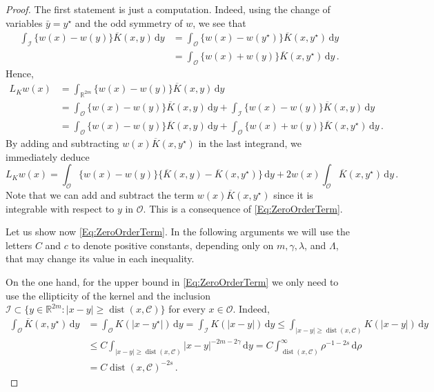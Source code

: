 \documentclass[12pt,reqno]{amsart}
\theoremstyle{definition}
\theoremstyle{remark}
\newcommand{\con}[1]{\mathbb{#1}}
\newcommand{\R}{\con{R}} %
\newcommand{\ccal}{\mathscr{C}}
\newcommand{\ical}{\mathcal{I}}
\newcommand{\ocal}{\mathcal{O}}
\newcommand{\s}{\gamma}
\renewcommand{\d}{\,\mathrm{d}} %
\DeclareMathOperator{\dist}{dist}
\numberwithin{equation}{section}
\begin{document}
	\begin{proof}
		The first statement is just a computation. Indeed,  using the change of variables  $\bar{y} = y^\star$ and the odd symmetry of $w$, we see that
		\begin{align*}
		\int_{\ical}  \{w(x) - w(y) \} \overline{K}(x, y)\d y &= \int_{\ocal} \{w(x) - w(y^\star) \}\overline{K}(x, y^\star)\d y \\
		&= \int_{\ocal} \{w(x) + w(y) \}\overline{K}(x, y^\star)\d y\,.
		\end{align*}
		Hence,
		\begin{align*}
		L_K w (x) &= \int_{\R^{2m}}  \{w(x) - w(y) \} \overline{K}(x, y)\d y \\
		&= \int_{\ocal}  \{w(x) - w(y) \} \overline{K}(x, y)\d y +\int_{\ical}  \{w(x) - w(y) \} \overline{K}(x, y)\d y \\
		&= \int_{\ocal} \{w(x) - w(y) \} \overline{K}(x, y) \d y +  \int_{\ocal} \{w(x) + w(y) \} \overline{K}(x, y^\star) \d y \,.
		\end{align*}
		By adding and subtracting $w(x)\overline{K}(x, y^\star)$ in the last integrand, we immediately deduce
		$$
		L_K w (x) =  \int_{\ocal} \{w(x) - w(y) \} \{\overline{K}(x, y) - \overline{K}(x, y^\star)  \} \d y +  2 w(x) \int_{\ocal} \overline{K}(x, y^\star) \d y\,.
		$$
		Note that we can add and subtract the term $w(x)\overline{K}(x, y^\star)$  since it is integrable with respect to $y$ in $\ocal$. This is a consequence of \eqref{Eq:ZeroOrderTerm}.
		
		Let us show now \eqref{Eq:ZeroOrderTerm}. In the following arguments we will use the letters $C$ and $c$ to denote positive constants, depending only on $m, \s, \lambda$, and $\Lambda$, that may change its value in each inequality. 
		
		On the one hand, for the upper bound in \eqref{Eq:ZeroOrderTerm} we only need to use the ellipticity of the kernel and the inclusion $\ical \subset \{y\in\R^{2m}:|x-y|\geq \dist(x,\ccal)\}$ for every $x\in \ocal$. Indeed,
		\begin{align*}
		\int_{\ocal} \overline{K}(x, y^\star) \d y &=  \int_{\ocal} K(|x-y^\star|) \d y = \int_{\ical} K(|x-y|) \d y \leq \int_{|x-y|\geq \dist(x,\ccal)} K(|x-y|) \d y \\
		&\leq C \int_{|x-y|\geq \dist(x,\ccal)} |x-y|^{-2m-2\s} \d y = C \int_{\dist(x,\ccal)}^\infty \rho^{-1-2s} \d \rho \\
		&= C \dist(x,\ccal)^{-2s}\,.
		\end{align*}
		

\end{proof}
\end{document}
